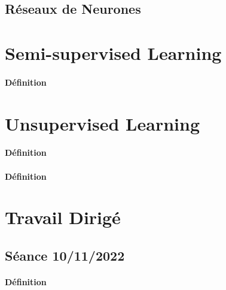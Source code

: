 \documentclass{article}
\begin{document}
\subsection{Réseaux de Neurones}


\section{Semi-supervised Learning}
\paragraph{Définition}

\section{Unsupervised Learning}
\paragraph{Définition}

\paragraph{Définition}


\section{Travail Dirigé}
\subsection{Séance 10/11/2022}
\paragraph{Définition}
\end{document}
